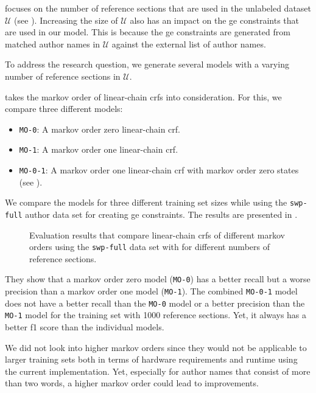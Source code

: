 \bigskip

 focuses on the number of reference sections that are used in the unlabeled dataset $\mathcal{U}$ (see ).
Increasing the size of $\mathcal{U}$ also has an impact on the \gls{ge} constraints that are used in our model.
This is because the \gls{ge} constraints are generated from matched author names in $\mathcal{U}$ against the external list of author names.

To address the research question, we generate several models with a varying number of reference sections in $\mathcal{U}$.

 takes the \gls{markov order} of \glspl{linear-chain crf} into consideration.
For this, we compare three different models:
\begin{itemize}
  \item \texttt{MO-0}: A \gls{markov order} zero \gls{linear-chain crf}.
  \item \texttt{MO-1}: A \gls{markov order} one \gls{linear-chain crf}.
  \item \texttt{MO-0-1}: A \gls{markov order} one \gls{linear-chain crf} with \gls{markov order} zero states (see ).
\end{itemize}
We compare the models for three different training set sizes while using the \texttt{swp-full} author data set for creating \gls{ge} constraints.
The results are presented in .
\begin{figure}[t]

\caption{Evaluation results that compare \glspl{linear-chain crf} of different \glspl{markov order} using the \texttt{swp-full} data set with for different numbers of reference sections.}
\label{fig:eval-markov-orders}
\end{figure}
They show that a \gls{markov order} zero model (\texttt{MO-0}) has a better \gls{recall} but a worse \gls{precision} than a \gls{markov order} one model (\texttt{MO-1}).
The combined \texttt{MO-0-1} model does not have a better recall than the \texttt{MO-0} model or a better precision than the \texttt{MO-1} model for the training set with \num{1000} reference sections.
Yet, it always has a better \gls{f1 score} than the individual models.

We did not look into higher \glspl{markov order} since they would not be applicable to larger training sets both in terms of hardware requirements and runtime using the current implementation.
Yet, especially for author names that consist of more than two words, a higher \gls{markov order} could lead to improvements.

